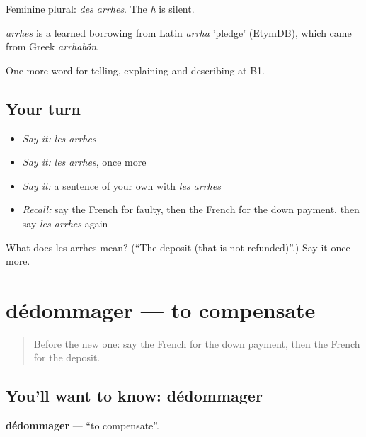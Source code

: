 Feminine plural: \emph{des arrhes}. The \emph{h} is silent.

\begin{cousinweb}
\emph{arrhes} is a learned borrowing from Latin \emph{arrha} 'pledge' (EtymDB), which came from Greek \emph{arrhab\'{\={o}}n}.
\end{cousinweb}

\begin{grammarlens}[title={What you've built}]
One more word for telling, explaining and describing at B1.
\end{grammarlens}

\subsection*{Your turn}
\begin{itemize}
\raggedright
  \item \emph{Say it:} \emph{les arrhes}
  \item \emph{Say it:} \emph{les arrhes}, once more
  \item \emph{Say it:} a sentence of your own with \emph{les arrhes}
  \item \emph{Recall:} say the French for faulty, then the French for the down payment, then say \emph{les arrhes} again
\end{itemize}

\begin{tcolorbox}[breakable,colback=teal!4,colframe=teal!35!black,title={Before you move on}]
What does les arrhes mean? (\textquotedblleft{}The deposit (that is not refunded)\textquotedblright{}.) Say it once more.
\end{tcolorbox}
\section[dédommager]{dédommager — to compensate}

\label{lesson:FR-C433-dedommager}



\begin{quote}
Before the new one: say the French for the down payment, then the French for the deposit.
\end{quote}

\subsection*{You'll want to know: dédommager}
\textbf{dédommager} — \textquotedblleft{}to compensate\textquotedblright{}.


